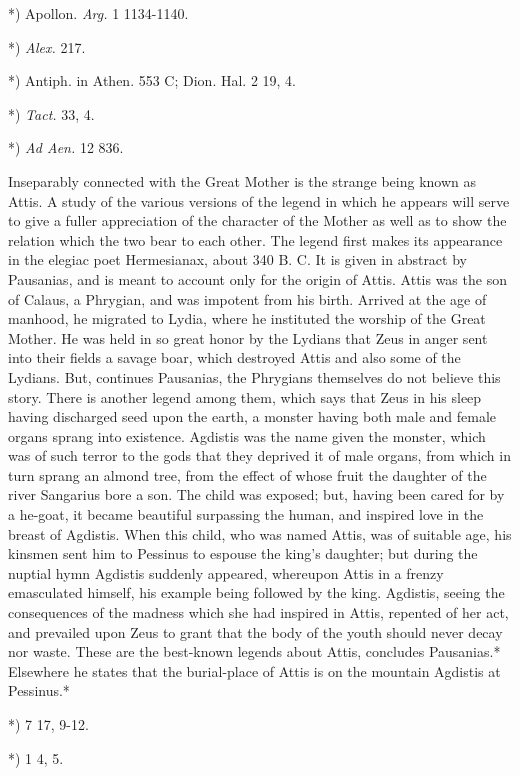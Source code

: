 \documentclass[a4paper, 11pt, oneside, polutonikogreek, english]{article}
\begin{document}
*) Apollon. \emph{Arg.} 1 1134-1140.

*) \emph{Alex.} 217.

*) Antiph. in Athen. 553 C; Dion. Hal. 2 19, 4.

*) \emph{Tact.} 33, 4.

*) \emph{Ad Aen.} 12 836.

Inseparably connected with the Great Mother is the strange being known as Attis. A study of the various versions of the legend in which he appears will serve to give a fuller appreciation of the character of the Mother as well as to show the relation which the two bear to each other. The legend first makes its appearance in the elegiac poet Hermesianax, about 340 B. C. It is given in abstract by Pausanias, and is meant to account only for the origin of Attis. Attis was the son of Calaus, a Phrygian, and was impotent from his birth. Arrived at the age of manhood, he migrated to Lydia, where he instituted the worship of the Great Mother. He was held in so great honor by the Lydians that Zeus in anger sent into their fields a savage boar, which destroyed Attis and also some of the Lydians. But, continues Pausanias, the Phrygians themselves do not believe this story. There is another legend among them, which says that Zeus in his sleep having discharged seed upon the earth, a monster having both male and female organs sprang into existence. Agdistis was the name given the monster, which was of such terror to the gods that they deprived it of male organs, from which in turn sprang an almond tree, from the effect of whose fruit the daughter of the river Sangarius bore a son. The child was exposed; but, having been cared for by a he-goat, it became beautiful surpassing the human, and inspired love in the breast of Agdistis. When this child, who was named Attis, was of suitable age, his kinsmen sent him to Pessinus to espouse the king's daughter; but during the nuptial hymn Agdistis suddenly appeared, whereupon Attis in a frenzy emasculated himself, his example being followed by the king. Agdistis, seeing the consequences of the madness which she had inspired in Attis, repented of her act, and prevailed upon Zeus to grant that the body of the youth should never decay nor waste. These are the best-known legends about Attis, concludes Pausanias.* Elsewhere he states that the burial-place of Attis is on the mountain Agdistis at Pessinus.*

*) 7 17, 9-12.

*) 1 4, 5.
\end{document}
